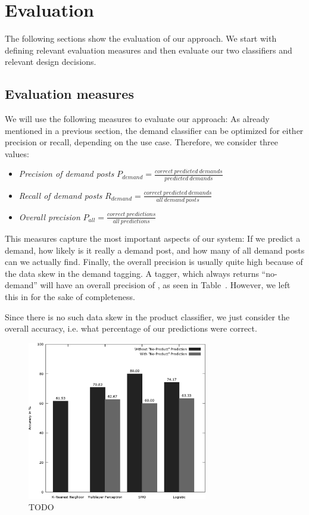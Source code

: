 
\section{Evaluation}
\label{sec:evaluation}

The following sections show the evaluation of our approach.
We start with defining relevant evaluation measures and then evaluate our two classifiers and relevant design decisions.

\subsection{Evaluation measures}
\label{sub:evaluation_measures}
We will use the following measures to evaluate our approach:
As already mentioned in a previous section, the demand classifier can be optimized for either precision or recall, depending on the use case.
Therefore, we consider three values:
\begin{itemize}
	\item
		\emph{Precision of demand posts}
		$P_{demand} = \frac{correct~predicted~demands}{predicted~demands}$
	\item
		\emph{Recall of demand posts}
		$R_{demand} = \frac{correct~predicted~demands}{all~demand~posts}$
	\item
		\emph{Overall precision}
		$P_{all} = \frac{correct~predictions}{all~predictions}$
\end{itemize}
This measures capture the most important aspects of our system: If we predict a demand, how likely is it really a demand post, and how many of all demand posts can we actually find.
Finally, the overall precision is usually quite high because of the data skew in the demand tagging.
A tagger, which always returns ``no-demand'' will have an overall precision of , as seen in Table~.
However, we left this in for the sake of completeness.

Since there is no such data skew in the product classifier, we just consider the overall accuracy, i.e. what percentage of our predictions were correct.

\begin{figure}
	\label{fig:product_eval}
	\begin{center}
		\includegraphics[width=0.7\textwidth]{figures/product_eval.eps}
	\end{center}
	\caption{TODO}
\end{figure}

